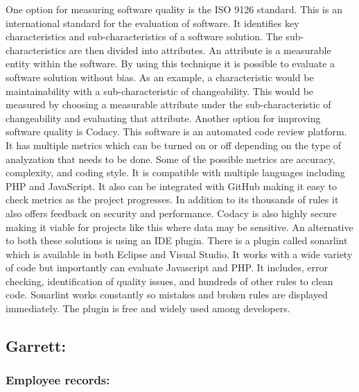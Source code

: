 \documentclass[letterpaper,10pt,titlepage,journal,compsoc,draftclsnofoot,onecolumn]{IEEEtran}
\newcommand\tab[1][1cm]{\hspace*{#1}}
\begin{document}
\tab One option for measuring software quality is the ISO 9126 standard. This is an international standard for the evaluation of software. It identifies key characteristics and sub-characteristics of a software solution. The sub-characteristics are then divided into attributes. An attribute is a measurable entity within the software. By using this technique it is possible to evaluate a software solution without bias. As an example, a characteristic would be maintainability with a sub-characteristic of changeability. This would be measured by choosing a measurable attribute under the sub-characteristic of changeability and evaluating that attribute. \newline\newline\tab Another option for improving software quality is Codacy. This software is an automated code review platform. It has multiple metrics which can be turned on or off depending on the type of analyzation that needs to be done. Some of the possible metrics are accuracy, complexity, and coding style. It is compatible with multiple languages including PHP and JavaScript. It also can be integrated with GitHub making it easy to check metrics as the project progresses. In addition to its thousands of rules it also offers feedback on security and performance. Codacy is also highly secure making it viable for projects like this where data may be sensitive. \newline\newline\tab An alternative to both these solutions is using an IDE plugin. There is a plugin called sonarlint which is available in both Eclipse and Visual Studio. It works with a wide variety of code but importantly can evaluate Javascript and PHP. It includes, error checking, identification of quality issues, and hundreds of other rules to clean code. Sonarlint works constantly so mistakes and broken rules are displayed immediately. The plugin is free and widely used among developers. \newline 

\subsection{Garrett:}
\subsubsection{Employee records:}
\end{document}
